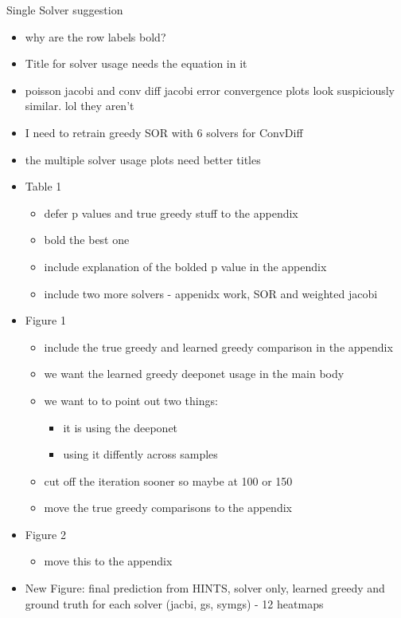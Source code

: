 \documentclass{article}
\begin{document}
Single Solver suggestion
\begin{itemize}
    \item why are the row labels bold?
    \item Title for solver usage needs the equation in it
    \item poisson jacobi and conv diff jacobi error convergence plots look suspiciously similar. lol they aren't
    \item I need to retrain greedy SOR with 6 solvers for ConvDiff
    \item the multiple solver usage plots need better titles
    \item Table 1
    \begin{itemize}
        \item defer p values and true greedy stuff to the appendix 
        \item bold the best one
        \item include explanation of the bolded p value in the appendix
        \item include two more solvers - appenidx work, SOR and weighted jacobi
    \end{itemize}
    \item Figure 1
    \begin{itemize}
        \item include the true greedy and learned greedy comparison in the appendix
        \item we want the learned greedy deeponet usage in the main body
        \item we want to to point out two things:
        \begin{itemize}
            \item it is using the deeponet
            \item using it diffently across samples
        \end{itemize}
        \item cut off the iteration sooner so maybe at 100 or 150
        \item move the true greedy comparisons to the appendix
    \end{itemize}
    \item Figure 2
    \begin{itemize}
        \item move this to the appendix
    \end{itemize}
    \item New Figure: final prediction from HINTS, solver only, learned greedy and ground truth for each solver (jacbi, gs, symgs) - 12 heatmaps

\end{itemize}
\end{document}
